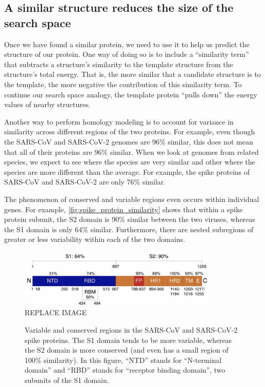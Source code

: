 \FloatBarrier
{}
\subsection{A similar structure reduces the size of the search space}

Once we have found a similar protein, we need to use it to help us predict the structure of our protein. One way of doing so is to include a ``similarity term'' that subtracts a structure's similarity to the template structure from the structure's total energy. That is, the more similar that a candidate structure is to the template, the more negative the contribution of this similarity term. To continue our search space analogy, the template protein ``pulls down'' the energy values of nearby structures.

Another way to perform homology modeling is to account for variance in similarity across different regions of the two proteins. For example, even though the SARS-CoV and SARS-CoV-2 genomes are 96\% similar, this does not mean that all of their proteins are 96\% similar. When we look at genomes from related species, we expect to see  where the species are very similar and other  where the species are more different than the average. For example, the spike proteins of SARS-CoV and SARS-CoV-2 are only 76\% similar.

The phenomenon of conserved and variable regions even occurs within individual genes. For example, \autoref{fig:spike_protein_similarity} shows that within a spike protein subunit, the S2 domain is 90\% similar between the two viruses, whereas the S1 domain is only 64\% similar. Furthermore, there are nested subregions of greater or less variability within each of the two domains.\\

\begin{figure}[h]
	\centering
	\mySfFamily
	\includegraphics[width = 0.85\textwidth]{../images/spike_protein_similarity.png}\\
	REPLACE IMAGE
	\caption{Variable and conserved regions in the SARS-CoV and SARS-CoV-2 spike proteins. The S1 domain tends to be more variable, whereas the S2 domain is more conserved (and even has a small region of 100\% similarity). In this figure, ``NTD'' stands for ``N-terminal domain'' and ``RBD'' stands for ``receptor binding domain'', two subunits of the S1 domain.}
	\label{fig:spike_protein_similarity}
\end{figure}

